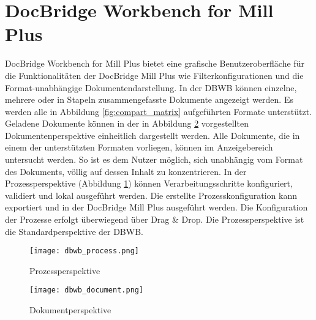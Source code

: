 \section{DocBridge\textsuperscript{\textregistered} Workbench for Mill Plus}{
\label{sec:DBWB}
DocBridge\textsuperscript{\textregistered} Workbench for Mill Plus bietet eine grafische Benutzeroberfläche für die Funktionalitäten der DocBridge\textsuperscript{\textregistered} Mill Plus wie Filterkonfigurationen und die Format-unabhängige Dokumentendarstellung. In der \ac{DBWB} können einzelne, mehrere oder in Stapeln zusammengefasste Dokumente angezeigt werden. Es werden alle in Abbildung \ref{fig:compart_matrix} aufgeführten Formate unterstützt. Geladene Dokumente können in der in Abbildung \ref{fig:dbwb_document} vorgestellten Dokumentenperspektive einheitlich dargestellt werden. Alle Dokumente, die in einem der unterstützten Formaten vorliegen, können im Anzeigebereich untersucht werden. So ist es dem Nutzer möglich, sich unabhängig vom Format des Dokuments, völlig auf dessen Inhalt zu konzentrieren. In der Prozessperspektive (Abbildung \ref{fig:dbwb_process}) können Verarbeitungsschritte konfiguriert, validiert und lokal ausgeführt werden. Die erstellte Prozesskonfiguration kann exportiert und in der DocBridge\textsuperscript{\textregistered} Mill Plus ausgeführt werden. Die Konfiguration der Prozesse erfolgt überwiegend über Drag \& Drop. Die Prozessperspektive ist die Standardperspektive der \ac{DBWB}.     

\newpage

\begin{figure}[htbp] 
\centering
     \texttt{[image: dbwb\_process.png]}
  \caption{Prozessperspektive}
  \label{fig:dbwb_process}
\end{figure}

\begin{figure}[htbp] 
\centering
     \texttt{[image: dbwb\_document.png]}
  \caption{Dokumentperspektive}
  \label{fig:dbwb_document}
\end{figure}


}
\newpage

